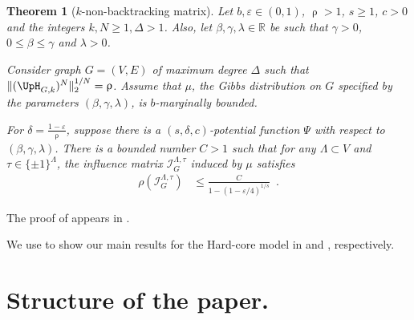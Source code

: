 \documentclass[11pt,reqno]{amsart}
\numberwithin{equation}{section}
\newtheorem{theorem}{Theorem}[section]
\newcommand{\cI}{{\mathcal{I}}}
\newcommand{\bluepigment}[1]{{\color{blue(pigment)}#1}}
\newcommand{\cadmiumgreen}[1]{{\color{cadmiumgreen}#1}}
\newcommand{\darkmagenta}[1]{{\color{darkmagenta}#1}}
\newcommand{\goldenbrown}[1]{{\color{goldenbrown}#1}}
\newcommand{\maxDeg}{{\Delta}}
\newcommand{\potF}{{\Psi}}
\newcommand{\pfs}{\darkmagenta{s}}
\newcommand{\infmatrix}{\cI}
\newcommand{\spradius}{{\rho}}
\newcommand{\nnorm}[3]{\goldenbrown{\|} #1\goldenbrown{\|}^{#2}_{#3}}
\newcommand{\NBMatrix}{\cadmiumgreen{\UpH}_{G,\kk}}
\newcommand{\spreadpoint}{\newpage}
\newcommand{\LastReviewG}[1]{{\color{magenta}\hspace{.2cm} [Rev: \textrm{#1} - \bluepigment{G} ] \hspace{.2cm}}}
\renewcommand{\LastReviewG}[1]{}
\renewcommand{\spreadpoint}{}
\renewcommand{\bluepigment}[1]{#1}
\renewcommand{\cadmiumgreen}[1]{#1}
\renewcommand{\darkmagenta}[1]{#1}
\renewcommand{\goldenbrown}[1]{#1}
\newcommand{\kk}{\bluepigment{k}}
\renewcommand{\kk}{k}
\newcommand{\SingBound}{\uprho}
\begin{document}
\begin{theorem}[$k$-non-backtracking matrix]\label{thrm:NonBacktrackingPotentialSpIn}
 Let $b,\varepsilon\in (0,1)$, $\SingBound> 1$, $\pfs \geq 1$, $c>0$ and 
 the integers $\kk,N \geq 1, \maxDeg > 1$.
%
Also, let $\beta,\gamma, \lambda\in \mathbb{R}$ be such that $\gamma >0$,
$0\leq \beta\leq \gamma$ and $\lambda>0$. 


Consider graph $G=(V,E)$ of maximum degree $\maxDeg$ such that 
$\nnorm{ (\NBMatrix)^N}{1/N}{2}= \SingBound$.
%
Assume that $\mu$, the Gibbs distribution on $G$ specified by the parameters $(\beta, \gamma, \lambda)$,
is $b$-marginally bounded.


For $\delta= \frac{1-\varepsilon}{\SingBound}$, suppose  there
is a $(\pfs,\delta,c)$-potential function $\potF$ with respect to $(\beta,\gamma,\lambda)$. 
%
There is a bounded number $C>1$ such that for any
$\Lambda\subset V$ and $\tau\in \{\pm 1\}^{\Lambda}$, the influence matrix
$\infmatrix^{\Lambda,\tau}_{G}$ induced by $\mu$ satisfies 
%
%
{\small
\begin{align}\nonumber 
 \spradius \left( \infmatrix^{\Lambda,\tau}_{G} \right) &\leq 
 \frac{C}{1-(1-\varepsilon/4)^{1/\pfs}} \enspace. 
\end{align}
}
\end{theorem}
The proof of  appears in .




We use  to show our
main results for the Hard-core model in  and , respectively. 



\begin{figure}[omitted: a diagram of this paper's results, not reproduced here]\label{fig:StrctHCNBacktracking}\end{figure}







 \begin{figure}[omitted: a diagram of this paper's results, not reproduced here]\label{fig:StrctHCAdjacency}\end{figure}




  \spreadpoint
\section{Structure of the paper. \LastReviewG{2025-03-31}}
\end{document}
